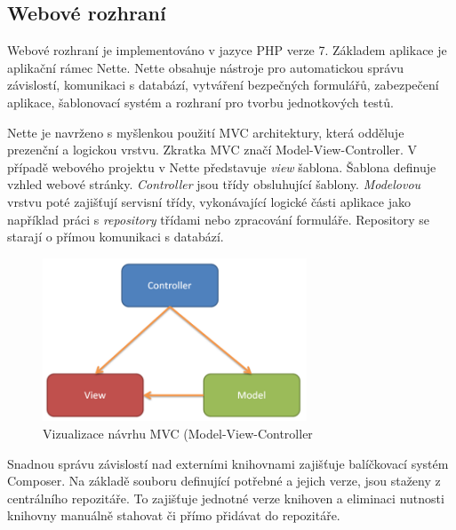 \documentclass[thesis=B,czech]{FITthesis}[2012/06/26]
\begin{document}
\subsection{Webové rozhraní}
Webové rozhraní je implementováno v jazyce PHP verze 7. Základem aplikace je aplikační rámec Nette\cite{nette}. Nette
obsahuje nástroje pro automatickou správu závislostí, komunikaci s databází, vytváření bezpečných formulářů, zabezpečení
aplikace, šablonovací systém a rozhraní pro tvorbu jednotkových testů. 
\par
Nette je navrženo s myšlenkou použití MVC architektury, která odděluje
prezenční a logickou vrstvu. Zkratka MVC značí Model-View-Controller. V případě webového projektu v Nette představuje \textit{view} šablona.
Šablona definuje vzhled webové stránky. \textit{Controller} jsou třídy obsluhující šablony. \textit{Modelovou} vrstvu poté zajišťují servisní třídy, vykonávající logické části aplikace jako 
například práci s \textit{repository} třídami nebo zpracování formuláře. Repository se starají o přímou komunikaci s databází.

\begin{figure}[h]\centering
 	\includegraphics[width=0.7\textwidth]{resources/mvc}
	\caption[MVC]{Vizualizace návrhu MVC (Model-View-Controller}\label{fig:mvc}
\end{figure}
\par
Snadnou správu závislostí nad externími knihovnami zajišťuje balíčkovací systém Composer\cite{composer}. 
Na základě souboru definující potřebné a jejich verze, jsou staženy z centrálního repozitáře. To zajišťuje jednotné verze knihoven
a eliminaci nutnosti knihovny manuálně stahovat či přímo přidávat do repozitáře.
\end{document}

